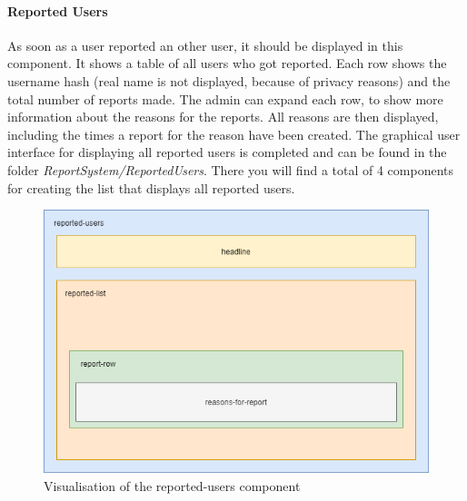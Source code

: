 \paragraph{Reported Users}
As soon as a user reported an other user, it should be displayed in this component.
It shows a table of all users who got reported.
Each row shows the username hash (real name is not displayed, because of privacy reasons) and the total number of
reports made.
The admin can expand each row, to show more information about the reasons for the reports.
All reasons are then displayed, including the times a report for the reason have been created.
The graphical user interface for displaying all reported users is completed and can be found in the folder
\textit{ReportSystem/ReportedUsers}.
There you will find a total of 4 components for creating the list that displays all reported users.

\begin{figure}[h]
    \centering
    \includegraphics[width=1.0\textwidth]{./images/report_component}
    \caption{Visualisation of the reported-users component}
    \label{fig:reportedusers}
\end{figure}


